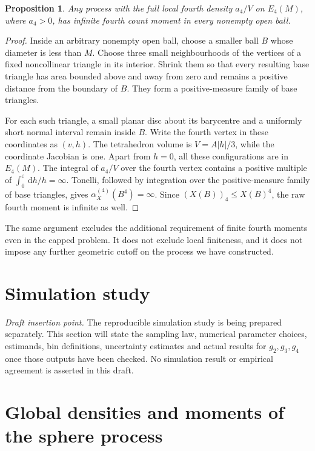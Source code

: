 \documentclass[11pt,a4paper]{article}
\numberwithin{equation}{section}
\newtheorem{proposition}[theorem]{Proposition}
\theoremstyle{definition}
\theoremstyle{remark}
\newcommand{\dd}{\,\mathrm d}
\begin{document}
\begin{proposition}\label{prop:fourth-infinite}
Any process with the full local fourth density $a_4/V$ on $E_4(M)$,
where $a_4>0$, has infinite fourth count moment in every nonempty open
ball.
\end{proposition}
\begin{proof}
Inside an arbitrary nonempty open ball, choose a smaller ball $B$ whose
diameter is less than $M$. Choose three small neighbourhoods of the
vertices of a fixed noncollinear triangle in its interior. Shrink them
so that every resulting base triangle has area bounded above and away
from zero and remains a positive distance from the boundary of $B$.
They form a positive-measure family of base triangles.

For each such triangle, a small planar disc about its barycentre and a
uniformly short normal interval remain inside $B$. Write the fourth
vertex in these coordinates as $(v,h)$. The tetrahedron volume is
$V=A|h|/3$, while the coordinate Jacobian is one. Apart from $h=0$, all
these configurations are in $E_4(M)$. The integral of $a_4/V$ over the
fourth vertex contains a positive multiple of
$\int_0^\varepsilon\dd h/h=\infty$. Tonelli, followed by integration
over the positive-measure family of base triangles, gives
$\alpha_X^{(4)}(B^4)=\infty$. Since $(X(B))_4\leq X(B)^4$, the raw
fourth moment is infinite as well.
\end{proof}

The same argument excludes the additional requirement of finite fourth
moments even in the capped problem. It does not exclude local finiteness,
and it does not impose any further geometric cutoff on the process we
have constructed.

\section{Simulation study}
\label{sec:simulation}
\emph{Draft insertion point.} The reproducible simulation study is being
prepared separately. This section will state the sampling law, numerical
parameter choices, estimands, bin definitions, uncertainty estimates and
actual results for $g_2,g_3,g_4$ once those outputs have been checked. No
simulation result or empirical agreement is asserted in this draft.

\appendix

\section{Global densities and moments of the sphere process}
\label{app:regularity}
\end{document}
